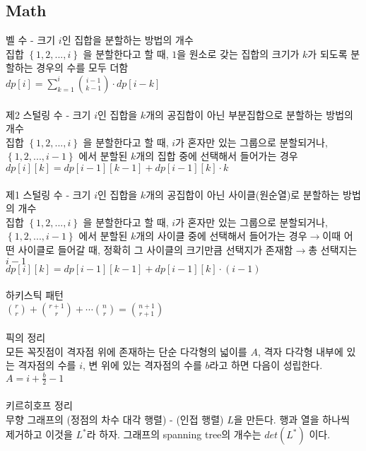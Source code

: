 \documentclass[landscape, 8pt, a4paper, oneside, twocolumn]{extarticle}
\begin{document}
	\subsection {Math}
		\noindent
		벨 수 - 크기 $i$인 집합을 분할하는 방법의 개수\\
		집합 $\left \{ 1,2, ... , i \right \}$ 을 분할한다고 할 때, $1$을 원소로 갖는 집합의 크기가 $k$가 되도록 분할하는 경우의 수를 모두 더함\\
		$dp[i]=\sum_{k=1}^{i}\binom{i-1}{k-1}\cdot dp[i-k]$\\\\
		제2 스털링 수 - 크기 $i$인 집합을 $k$개의 공집합이 아닌 부분집합으로 분할하는 방법의 개수\\
		집합 $\left \{ 1,2, ... , i \right \}$ 을 분할한다고 할 때, $i$가 혼자만 있는 그룹으로 분할되거나, $\left \{ 1,2, ... , i-1 \right \}$ 에서 분할된 $k$개의 집합 중에 선택해서 들어가는 경우\\
		$dp[i][k] = dp[i-1][k-1]+dp[i-1][k]\cdot k$\\\\
		제1 스털링 수 - 크기 $i$인 집합을 $k$개의 공집합이 아닌 사이클(원순열)로 분할하는 방법의 개수\\
		집합 $\left \{ 1,2, ... , i \right \}$ 을 분할한다고 할 때, $i$가 혼자만 있는 그룹으로 분할되거나, $\left \{ 1,2, ... , i-1 \right \}$ 에서 분할된 $k$개의 사이클 중에 선택해서 들어가는 경우$\rightarrow $이때 어떤 사이클로 들어갈 때, 정확히 그 사이클의 크기만큼 선택지가 존재함$\rightarrow $총 선택지는 $i-1$\\
		$dp[i][k] = dp[i-1][k-1]+dp[i-1][k]\cdot (i-1)$\\\\
		하키스틱 패턴\\
		$\binom{r}{r}+\binom{r+1}{r}+\cdots \binom{n}{r}=\binom{n+1}{r+1}$\\\\
		픽의 정리\\
		모든 꼭짓점이 격자점 위에 존재하는 단순 다각형의 넓이를 $A$, 격자 다각형 내부에 있는 격자점의 수를 $i$, 변 위에 있는 격자점의 수를 $b$라고 하면 다음이 성립한다.\\
		$A=i+\frac{b}{2}-1$\\\\
		키르히호프 정리\\
		무향 그래프의 (정점의 차수 대각 행렬) - (인접 행렬) $L$을 만든다. 행과 열을 하나씩 제거하고 이것을 $L^{*}$라 하자. 그래프의 spanning tree의 개수는 $det(L^{*})$ 이다.\\\\
\end{document}

